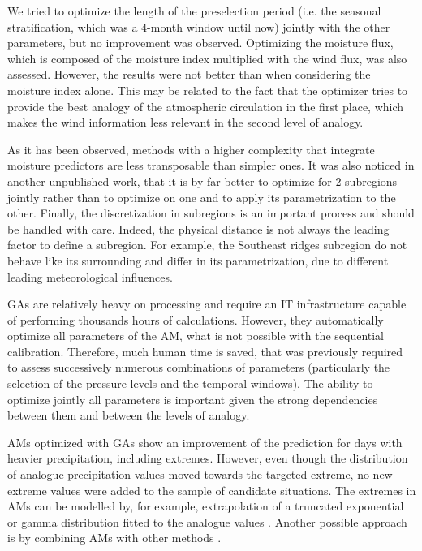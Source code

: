 \documentclass[review]{elsarticle}
\begin{document}
We tried to optimize the length of the preselection period (i.e. the seasonal stratification, which was a 4-month window until now) jointly with the other parameters, but no improvement was observed. Optimizing the moisture flux, which is composed of the moisture index multiplied with the wind flux, was also assessed. However, the results were not better than when considering the moisture index alone. This may be related to the fact that the optimizer tries to provide the best analogy of the atmospheric circulation in the first place, which makes the wind information less relevant in the second level of analogy.

As it has been observed, methods with a higher complexity that integrate moisture predictors are less transposable than simpler ones. It was also noticed in another unpublished work, that it is by far better to optimize for 2 subregions jointly rather than to optimize on one and to apply its parametrization to the other. Finally, the discretization in subregions is an important process and should be handled with care. Indeed, the physical distance is not always the leading factor to define a subregion. For example, the Southeast ridges subregion do not behave like its surrounding and differ in its parametrization, due to different leading meteorological influences.

GAs are relatively heavy on processing and require an IT infrastructure capable of performing thousands hours of calculations. However, they automatically optimize all parameters of the AM, what is not possible with the sequential calibration. Therefore, much human time is saved, that was previously required to assess successively numerous combinations of parameters (particularly the selection of the pressure levels and the temporal windows). The ability to optimize jointly all parameters is important given the strong dependencies between them and between the levels of analogy.

AMs optimized with GAs show an improvement of the prediction for days with heavier precipitation, including extremes. However, even though the distribution of analogue precipitation values moved towards the targeted extreme, no new extreme values were added to the sample of candidate situations. The extremes in AMs can be modelled by, for example, extrapolation of a truncated exponential or gamma distribution fitted to the analogue values \citep{Obled2002}. Another possible approach is by combining AMs with other methods \citep[e.g.][]{Chardon2014}.
\end{document}
